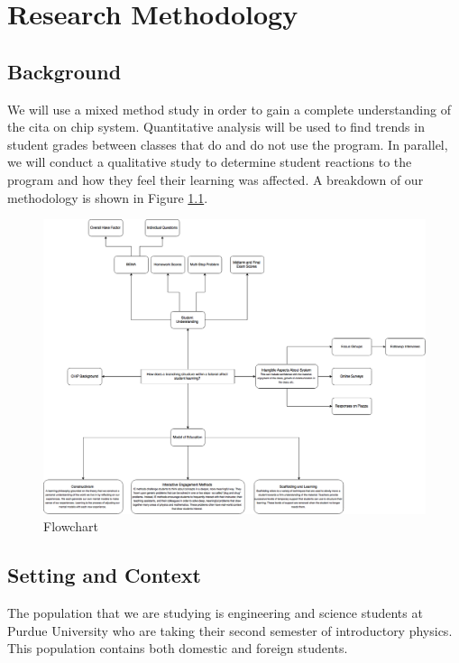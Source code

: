 \chapter[Research Methodology]{Research Methodology}

\section{Background}

We will use a mixed method study in order to gain a complete understanding of the \gls{cita} on \gls{chip} system. Quantitative analysis will be used to find trends in student grades between classes that do and do not use the program. In parallel, we will conduct a qualitative study to determine student reactions to the program and how they feel their learning was affected. A breakdown of our methodology is shown in Figure \ref{fig:flowchart}.

\begin{figure}[!htb]
	\centering
	\includegraphics[width=6in]{img/chapter3/flowchart}
	\caption[Flowchart]{Flowchart}
  \label{fig:flowchart}
\end{figure}

\section{Setting and Context}

The population that we are studying is engineering and science students at Purdue University who are taking their second semester of introductory physics. This population contains both domestic and foreign students.

